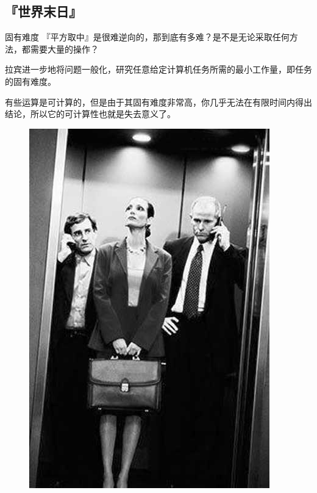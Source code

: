 \documentclass{beamer}
\begin{document}
\subsection{『世界末日』}
\begin{frame}{固有难度}
\setlength{\parskip}{0em}
	『平方取中』是很难逆向的，那到底有多难？是不是无论采取任何方法，都需要大量的操作？\pause
	
	拉宾进一步地将问题一般化，研究任意给定计算机任务所需的最小工作量，即任务的固有难度。\pause
	
	有些运算是可计算的，但是由于其固有难度非常高，你几乎无法在有限时间内得出结论，所以它的可计算性也就是失去意义了。\pause
	
	\begin{figure}
		\begin{minipage}{0.4\textwidth}\centering
			\includegraphics[height=4\baselineskip]{figures/dt.eps}
		\end{minipage}
		\begin{minipage}{0.4\textwidth}\centering

\end{minipage}
\end{figure}
\end{frame}
\end{document}
